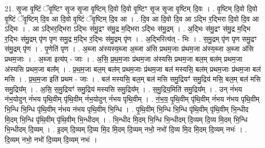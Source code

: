 \documentclass[17pt]{extarticle}
\begin{document}
21. सृ॒जा वृ॒ष्टिं ॅवृ॒ष्टिꣳ सृ॒ज सृ॒जा वृ॒ष्टिम् दि॒वो दि॒वो वृ॒ष्टिꣳ सृ॒ज सृ॒जा वृ॒ष्टिम् दि॒वः । . वृ॒ष्टिम् दि॒वो दि॒वो वृ॒ष्टिं ॅवृ॒ष्टिम् दि॒व आ दि॒वो वृ॒ष्टिं ॅवृ॒ष्टिम् दि॒व आ । . दि॒व आ दि॒वो दि॒व आ ऽद्भि र॒द्भिरा दि॒वो दि॒व आ ऽद्भिः । . आ ऽद्भिर॒द्भिरा ऽद्भिः स॑मु॒द्रꣳ स॑मु॒द्र म॒द्भिरा ऽद्भिः स॑मु॒द्रम् । . अ॒द्भिः स॑मु॒द्रꣳ स॑मु॒द्र म॒द्भि र॒द्भिः स॑मु॒द्रम् पृ॑ण पृण समु॒द्र म॒द्भि र॒द्भिः स॑मु॒द्रम् पृ॑ण । . अ॒द्भिरित्य॑त् - भिः । . स॒मु॒द्रम् पृ॑ण पृण समु॒द्रꣳ स॑मु॒द्रम् पृ॑ण । . पृ॒णेति॑ पृण । . अ॒ब्जा अ॑स्यस्य॒ब्जा अ॒ब्जा अ॑सि प्रथम॒जाः प्र॑थम॒जा अ॑स्य॒ब्जा अ॒ब्जा अ॑सि प्रथम॒जाः । . अ॒ब्जा इत्य॑प् - जाः । . अ॒सि॒ प्र॒थ॒म॒जाः प्र॑थम॒जा अ॑स्यसि प्रथम॒जा बल॒म् बल॑म् प्रथम॒जा अ॑स्यसि प्रथम॒जा बल᳚म् । . प्र॒थ॒म॒जा बल॒म् बल॑म् प्रथम॒जाः प्र॑थम॒जा बल॑ मस्यसि॒ बल॑म् प्रथम॒जाः प्र॑थम॒जा बल॑ मसि । . प्र॒थ॒म॒जा इति॑ प्रथम - जाः । . बल॑ मस्यसि॒ बल॒म् बल॑ मसि समु॒द्रियꣳ॑ समु॒द्रिय॑ मसि॒ बल॒म् बल॑ मसि समु॒द्रिय᳚म् । . अ॒सि॒ स॒मु॒द्रियꣳ॑ समु॒द्रिय॑ मस्यसि समु॒द्रिय᳚म् । . स॒मु॒द्रिय॒मिति॑ समु॒द्रिय᳚म् । . उन् नं॑भय नंभ॒योदुन् नं॑भय पृथि॒वीम् पृ॑थि॒वीम् नं॑भ॒योदुन् नं॑भय पृथि॒वीम् । . नं॒भ॒य॒ पृ॒थि॒वीम् पृ॑थि॒वीम् नं॑भय नंभय पृथि॒वीम् भि॒न्धि भि॒न्धि पृ॑थि॒वीम् नं॑भय नंभय पृथि॒वीम् भि॒न्धि । . पृ॒थि॒वीम् भि॒न्धि भि॒न्धि पृ॑थि॒वीम् पृ॑थि॒वीम् भि॒न्धीद मि॒दम् भि॒न्धि पृ॑थि॒वीम् पृ॑थि॒वीम् भि॒न्धीदम् । . भि॒न्धीद मि॒दम् भि॒न्धि भि॒न्धीदम् दि॒व्यम् दि॒व्य मि॒दम् भि॒न्धि भि॒न्धीदम् दि॒व्यम् । . इ॒दम् दि॒व्यम् दि॒व्य मि॒द मि॒दम् दि॒व्यम् नभो॒ नभो॑ दि॒व्य मि॒द मि॒दम् दि॒व्यम् नभः॑ । . दि॒व्यम् नभो॒ नभो॑ दि॒व्यम् दि॒व्यम् नभः॑ । \newline
\end{document}
